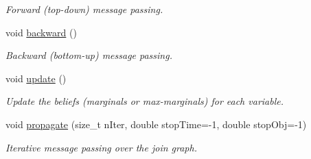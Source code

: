 \begin{DoxyCompactItemize}
\begin{DoxyCompactList}\small\item\em Forward (top-\/down) message passing. \end{DoxyCompactList}\item 
void \hyperlink{classmerlin_1_1ijgp_a8b80c5fed9c242c85200c84885282287}{backward} ()\hypertarget{classmerlin_1_1ijgp_a8b80c5fed9c242c85200c84885282287}{}\label{classmerlin_1_1ijgp_a8b80c5fed9c242c85200c84885282287}

\begin{DoxyCompactList}\small\item\em Backward (bottom-\/up) message passing. \end{DoxyCompactList}\item 
void \hyperlink{classmerlin_1_1ijgp_ac44f5db012d6b2ef76aae27a6eaff0da}{update} ()\hypertarget{classmerlin_1_1ijgp_ac44f5db012d6b2ef76aae27a6eaff0da}{}\label{classmerlin_1_1ijgp_ac44f5db012d6b2ef76aae27a6eaff0da}

\begin{DoxyCompactList}\small\item\em Update the beliefs (marginals or max-\/marginals) for each variable. \end{DoxyCompactList}\item 
void \hyperlink{classmerlin_1_1ijgp_a76bf2137d3b82d923d1d4dcbd5353b21}{propagate} (size\+\_\+t n\+Iter, double stop\+Time=-\/1, double stop\+Obj=-\/1)
\begin{DoxyCompactList}\small\item\em Iterative message passing over the join graph. \end{DoxyCompactList}\end{DoxyCompactItemize}
